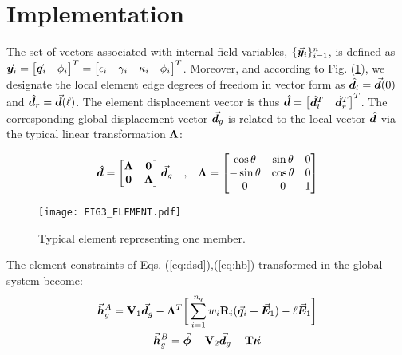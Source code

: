 \section{Implementation}\label{section:CH2-S4}

The set of vectors associated with internal field variables,
$\{\vec{\bm{y}}_i\}_{i=1}^n$, is defined as $\vec{\bm{y}}_i =\begin{bmatrix}
	\vec{\bm{q}}_i & \phi_i
\end{bmatrix}^T= \begin{bmatrix}
	\epsilon_i & \gamma_i & \kappa_i & \phi_i
\end{bmatrix}^T$. Moreover, and according to Fig. (\ref{fig:fig3}), we designate
the local element edge degrees of freedom in vector form as
$\hat{\boldsymbol{d}}_l = \vec{\bm{d}}(0)$ and $\hat{\boldsymbol{d}}_r = \vec{\bm{d}}(\ell)$. The element 
displacement
vector is thus $\hat{\boldsymbol{d}} = \begin{bmatrix} \hat{\boldsymbol{d}}_l^T & \hat{\boldsymbol{d}}_r^T 
\end{bmatrix}^T$. The corresponding
global displacement vector $\vec{\bm{d}}_g$ is related to the local 
vector
$\hat{\boldsymbol{d}}$ via the typical linear transformation $\mathbf{\Lambda}$:  %

\begin{gather}
	\hat{\boldsymbol{d}} = \begin{bmatrix}
		\mathbf{\Lambda} & \mathbf{0}\\
		\mathbf{0} & \mathbf{\Lambda}
	\end{bmatrix}\vec{\bm{d}}_g
	\quad\text{,}\quad \mathbf{\Lambda}=\begin{bmatrix}
		\cos\theta & \sin\theta & 0\\
		-\sin\theta & \cos\theta & 0\\
		0 & 0 & 1
	\end{bmatrix}
\end{gather}

\begin{figure}[b]
	\centering
	\texttt{[image: FIG3\_ELEMENT.pdf]}
	\caption{Typical element representing one member.}
	\label{fig:fig3}
\end{figure}

\noindent The element constraints of Eqs. (\ref{eq:dsd}),(\ref{eq:hb})
transformed in the global system become:  %
\begin{subequations}
	\begin{gather}
		\vec{\bm{h}}^A_g = \mathbf{V}_1\vec{\bm{d}}_g - 
		\mathbf{\Lambda}^T\bigg[\sum_{i=1}^{n_q}
		w_i\mathbf{R}_i(\vec{\bm{q}}_i+\vec{\bm{E}}_1) - \ell\vec{\bm{E}}_1\bigg]
		\label{eq:impsd1}\\
		\vec{\bm{h}}^B_g = \vec{\bm{\phi}}-\mathbf{V}_2\vec{\bm{d}}_g - \mathbf{T}\vec{\bm{\kappa}}
		\label{eq:impsd2}
	\end{gather}
\end{subequations}

